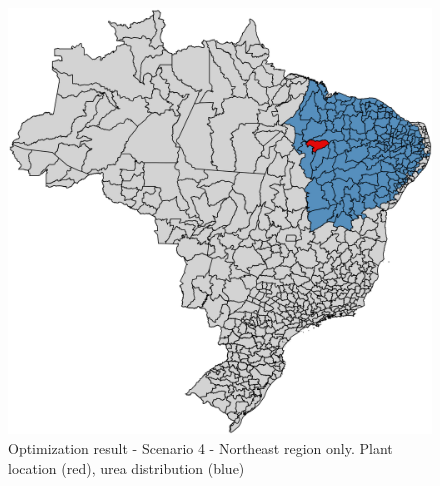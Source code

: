 \documentclass[a4paper, titlepage]{article}
\begin{document}
\begin{figure}
	\includegraphics[width=\textwidth]{img/optimization_result_4.png}
	\caption{Optimization result - Scenario 4 - Northeast region only. Plant location (red), urea distribution (blue)}
	\label{img_optimizationresults_4}
\end{figure}
\end{document}
